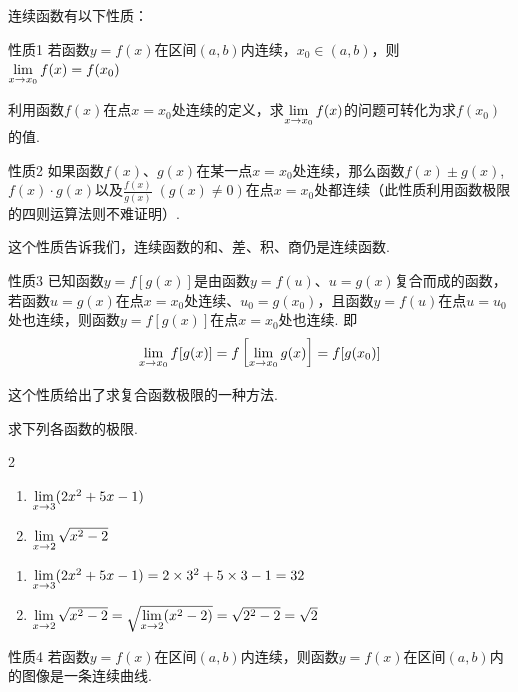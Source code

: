 连续函数有以下性质：

\begin{thm}{性质1}
    若函数$y=f(x)$在区间$(a,b)$内连续，$x_0\in (a,b)$，则$\lim\limits_{x\to x_0}f(x)=f(x_0)$
\end{thm}

利用函数$f(x)$在点$x=x_0$处连续的定义，求$\lim\limits_{x\to x_0}f(x)$的问题可转化为求$f(x_0)$的值.

\begin{thm}{性质2}
    如果函数$f(x)$、$g(x)$在某一点$x=x_0$处连续，那么函数$f(x)\pm g(x)$, $f(x)\cdot g(x)$以及$\frac{f(x)}{g(x)}\; (g(x)\ne 0)$在点$x=x_0$处都连续（此性质利用函数极限的四则运算法则不难证明）.
\end{thm}

这个性质告诉我们，连续函数的和、差、积、商仍是连续函数.

\begin{thm}{性质3}
    已知函数$y=f[g(x)]$是由函数$y=f(u)$、$u=g(x)$复合而成的函数，若函数$u=g(x)$在点$x=x_0$处连续、$u_0=g(x_0)$，且函数$y=f(u)$在点$u=u_0$处也连续，则函数$y=f[g(x)]$在点$x=x_0$处也连续. 即
\[\lim\limits_{x\to x_0} f[g(x)]=f\left[\lim\limits_{x\to x_0} g(x)\right]=f[g(x_0)]  \]
\end{thm}

这个性质给出了求复合函数极限的一种方法.

\begin{example}
    求下列各函数的极限.
\begin{multicols}{2}
\begin{enumerate}[(1)]
    \item $\lim\limits_{x\to 3}(2x^2+5x-1)$
    \item $\lim\limits_{x\to 2}\sqrt{x^2-2}$
\end{enumerate}
\end{multicols}
\end{example}

\begin{solution}
\begin{enumerate}[(1)]
    \item $\lim\limits_{x\to 3}(2x^2+5x-1)=2\times 3^2+5\times 3-1=32$
    \item $\lim\limits_{x\to 2}\sqrt{x^2-2}=\sqrt{\lim\limits_{x\to 2}(x^2-2)}=\sqrt{2^2-2}=\sqrt{2}$
\end{enumerate}
\end{solution}    

\begin{thm}{性质4}
    若函数$y=f(x)$在区间$(a,b)$内连续，则函数$y=f(x)$在区间$(a,b)$内的图像是一条连续曲线.
\end{thm}

